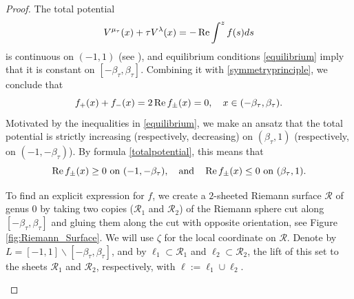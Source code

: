 \documentclass[reqno,11pt]{amsart}
\theoremstyle{plain}
\theoremstyle{definition}
\theoremstyle{remark}
\numberwithin{equation}{section}
\renewcommand{\Re}{\mathop{\rm Re}}
\begin{document}
\begin{proof}
   The total potential 
    \begin{equation}
        \label{totalpotential}
    V^{\mu_\tau}(x)+\tau V^\lambda(x)=-\Re \int^z f(s) ds
     \end{equation}
    is continuous on $(-1,1)$ (see \cite[Section IV.2]{Saff:97}), and equilibrium conditions \eqref{equilibrium} imply that it
    is constant on $[-\beta_\tau,\beta_\tau]$. Combining it with \eqref{symmetryprinciple}, we conclude that 
    \begin{equation}
        f_+(x)+f_-(x)=2\Re f_\pm(x)=0, \quad  x\in(-\beta_\tau,\beta_\tau).
        \label{f_tau<-1_limit_sum_property}
    \end{equation}
 Motivated by the inequalities in \eqref{equilibrium}, we make an ansatz that the total potential is strictly increasing (respectively, decreasing) on $(\beta_\tau,1)$ (respectively, on $(-1,-\beta_\tau)$). By formula \eqref{totalpotential}, this means that
    \begin{equation}
        \Re f_\pm(x)\geq 0 \text{ on } (-1,-\beta_\tau), \quad  \text{and} \quad \Re f_\pm(x)\leq0 \text{ on } (\beta_\tau,1).
        \label{f_tau<-1_Re_f_sign_property}
    \end{equation}
    
To find an explicit expression for $f$, we create a $2$-sheeted Riemann surface $\mathcal{R}$ of genus 0 by taking two copies ($\mathcal{R}_1$ and $\mathcal{R}_2$) of the Riemann sphere cut along $[-\beta_\tau,\beta_\tau]$ and gluing them along the cut with opposite orientation, see Figure \ref{fig:Riemann_Surface}. We will use $\zeta$ for the local coordinate on $\mathcal R$. Denote by $L=[-1,1]\backslash[-\beta_\tau,\beta_\tau]$, and by $\ell_1\subset \mathcal{R}_1$ and $\ell_2 \subset\mathcal{R}_2$, the lift of this set to the sheets $\mathcal R_1$ and $\mathcal R_2$, respectively, with $\ell:=\ell_1 \cup \ell_2$.

    \begin{figure}[ht]
        \centering
\end{figure}
\end{proof}
\end{document}
